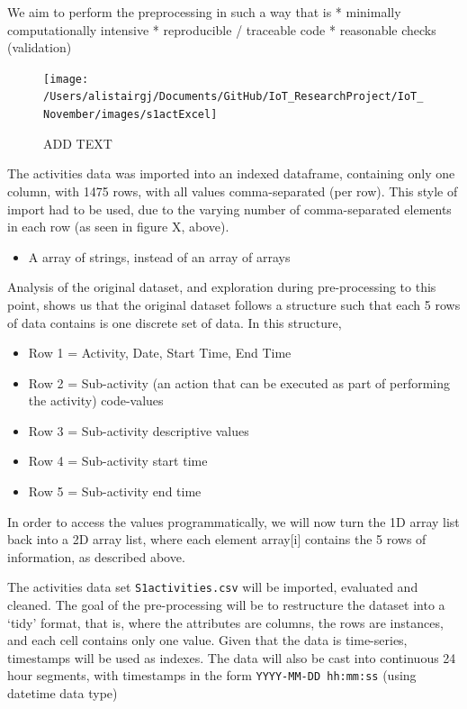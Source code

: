 \documentclass[11pt,]{article}
\providecommand{\tightlist}{%
  \setlength{\itemsep}{0pt}\setlength{\parskip}{0pt}}
\begin{document}
We aim to perform the preprocessing in such a way that is * minimally
computationally intensive * reproducible / traceable code * reasonable
checks (validation)

\begin{figure}[H]

{\centering \texttt{[image: /Users/alistairgj/Documents/GitHub/IoT\_ResearchProject/IoT\_November/images/s1actExcel]} 

}

\caption{ADD TEXT}\label{fig:unnamed-chunk-15}
\end{figure}

The activities data was imported into an indexed dataframe, containing
only one column, with 1475 rows, with all values comma-separated (per
row). This style of import had to be used, due to the varying number of
comma-separated elements in each row (as seen in figure X, above).

\begin{itemize}
\tightlist
\item
  A array of strings, instead of an array of arrays
\end{itemize}

Analysis of the original dataset, and exploration during pre-processing
to this point, shows us that the original dataset follows a structure
such that each 5 rows of data contains is one discrete set of data. In
this structure,

\begin{itemize}
\tightlist
\item
  Row 1 = Activity, Date, Start Time, End Time
\item
  Row 2 = Sub-activity (an action that can be executed as part of
  performing the activity) code-values
\item
  Row 3 = Sub-activity descriptive values
\item
  Row 4 = Sub-activity start time
\item
  Row 5 = Sub-activity end time
\end{itemize}

In order to access the values programmatically, we will now turn the 1D
array list back into a 2D array list, where each element array{[}i{]}
contains the 5 rows of information, as described above.

The activities data set \texttt{S1activities.csv} will be imported,
evaluated and cleaned. The goal of the pre-processing will be to
restructure the dataset into a `tidy' format, that is, where the
attributes are columns, the rows are instances, and each cell contains
only one value. Given that the data is time-series, timestamps will be
used as indexes. The data will also be cast into continuous 24 hour
segments, with timestamps in the form \texttt{YYYY-MM-DD\ hh:mm:ss}
(using datetime data type)
\end{document}
